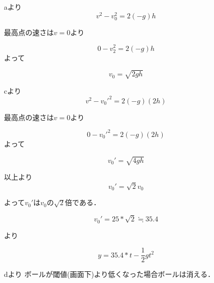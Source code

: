 \begin{itemize}
    \item[aより]
        \begin{equation}
            v^2-v_0^2=2(-g)h
        \end{equation}

        最高点の速さは$v=0$より 

        \begin{equation}
            0-v_2^2=2(-g)h
        \end{equation}
\clearpage
        よって

        \begin{equation}
            v_0=\sqrt{2gh}
        \end{equation}

    \item[cより]
        \begin{equation}
            v^2-v_0'^2=2(-g)(2h)
        \end{equation}

        最高点の速さは$v=0$より 

        \begin{equation}
            0-v_0'^2=2(-g)(2h)
        \end{equation}
        よって

        \begin{equation}
            v_0'=\sqrt{4gh}
        \end{equation}

    \item[以上より]
        \begin{equation}
            v_0'=\sqrt{2}v_0
        \end{equation}

        よって$v_0'$は$v_0$の$\sqrt{2}$倍である． 

        \begin{equation}
            v_0'=25*\sqrt{2} \fallingdotseq 35.4 
        \end{equation}

        より

        \begin{equation}
            y=35.4*t-\frac{1}{2}gt^2
        \end{equation}

    \item[dより] ボールが閾値(画面下)より低くなった場合ボールは消える． 

\end{itemize}


